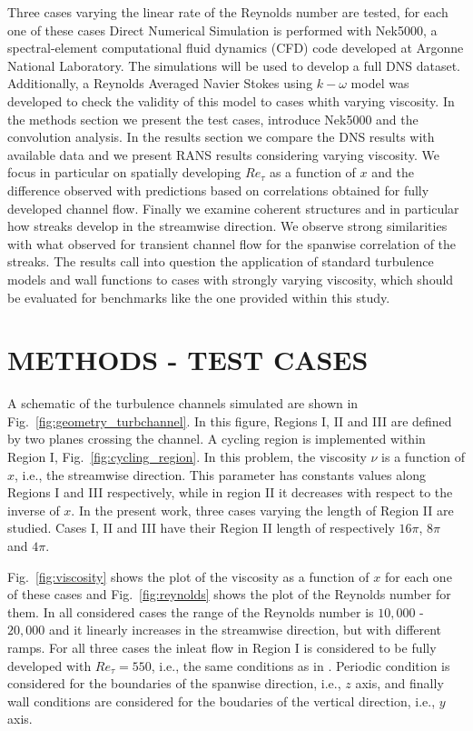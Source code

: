 \documentclass[twocolumn,10pt]{asme2e}
\begin{document}
Three cases varying the linear rate of the Reynolds number are tested, for each one of these cases Direct Numerical Simulation is performed with Nek5000, a spectral-element computational fluid dynamics (CFD) code developed at Argonne National Laboratory. The simulations will be used to develop a full DNS dataset. Additionally, a Reynolds Averaged Navier Stokes using \(k-\omega\) model was developed to check the validity of this model to cases whith varying viscosity. In the methods section we present the test cases, introduce Nek5000 and the convolution analysis. In the results section we compare the DNS results with available data and we present RANS results considering varying viscosity. We focus in particular on spatially developing $Re_{\tau}$ as a function of $x$ and the difference observed with predictions based on correlations obtained for fully developed channel flow. Finally we examine coherent structures and in particular how streaks develop in the streamwise direction. We observe strong similarities with what observed for transient channel flow for the spanwise correlation of the streaks. The results call into question the application of standard turbulence models and wall functions to cases with strongly varying viscosity, which should be evaluated for benchmarks like the one provided within this study.


\section*{METHODS - TEST CASES}

A schematic of the turbulence channels simulated are shown in Fig.~\ref{fig:geometry_turbchannel}. In this figure, Regions I, II and III are defined by two planes crossing the channel. A cycling region is implemented within Region I, Fig.~\ref{fig:cycling_region}. In this problem, the viscosity \(\nu\) is a function of \(x\), i.e., the streamwise direction. This parameter has constants values along Regions I and III respectively, while in region II it decreases with respect to the inverse of \(x\). In the present work, three cases varying the length of Region II are studied. Cases I, II and III have their Region II length of respectively \(16\pi\), \(8\pi\) and \(4\pi\).

Fig.~\ref{fig:viscosity} shows the plot of the viscosity as a function of \(x\) for each one of these cases and Fig.~\ref{fig:reynolds} shows the plot of the Reynolds number for them. In all considered cases the range of the Reynolds number is \(10,000\) - \(20,000\) and it linearly increases in the streamwise direction, but with different ramps. For all three cases the inleat flow in Region I is considered to be fully developed with \(Re_{\tau}=550\), i.e., the same conditions as in \cite{hoyas2008}. Periodic condition is considered for the boundaries of the spanwise direction, i.e., \(z\) axis, and finally wall conditions are considered for the boudaries of the vertical direction, i.e., \(y\) axis.
\end{document}
